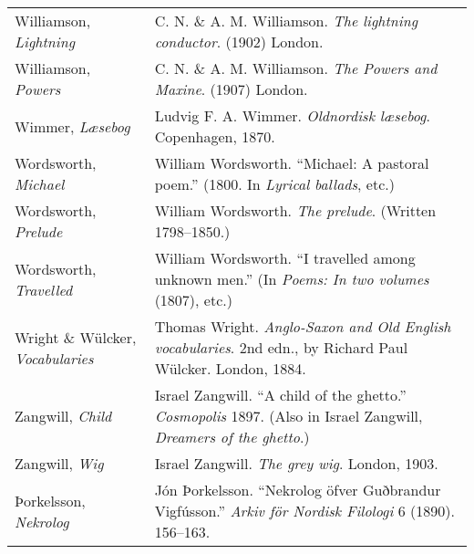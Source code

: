 \begin{longtable}{p{} p{}}
Williamson, \textit{Lightning} & C. N. \& A. M. Williamson. \textit{The lightning conductor}. (1902) London. \\ 
Williamson, \textit{Powers} & C. N. \& A. M. Williamson. \textit{The Powers and Maxine}. (1907) London. \\ 

Wimmer, \textit{Læsebog} & Ludvig F. A. Wimmer. \textit{Oldnordisk læsebog}. Copenhagen, 1870. \\

Wordsworth, \textit{Michael} & William Wordsworth. ``Michael: A pastoral poem.''  (1800. In \textit{Lyrical ballads}, etc.)\\
Wordsworth, \textit{Prelude} & William Wordsworth. \textit{The prelude}. (Written 1798--1850.)\\
Wordsworth, \textit{Travelled} & William Wordsworth. ``I travelled among unknown men.'' (In \textit{Poems: In two volumes} (1807), etc.) \\

%
\raggedright{Wright \& Wülcker, \textit{Vocabularies}} & Thomas Wright. \textit{Anglo-Saxon and Old English vocabularies}. 2nd edn., by Richard Paul Wülcker. London, 1884. \\ %
%
 
Zangwill, \textit{Child} & Israel Zangwill. ``A child of the ghetto.'' \textit{Cosmopolis} 1897. (Also in Israel Zangwill, \textit{Dreamers of the ghetto}.) \\ %
Zangwill, \textit{Wig} & Israel Zangwill. \textit{The grey wig}. London, 1903.\\
%
    
Þorkelsson, \textit{Nekrolog} & Jón Þorkelsson. ``Nekrolog öfver Guðbrandur Vigfússon.'' \textit{Arkiv för Nordisk Filologi} 6 (1890). 156--163.\\
\end{longtable}
